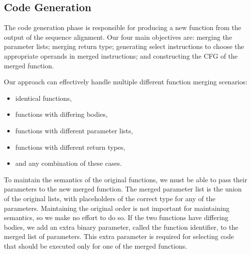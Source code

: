 

\subsection{Code Generation}
The code generation phase is responsible for producing a new function from the output of the sequence alignment.
Our four main objectives are: merging the parameter lists; merging return type; generating select instructions to choose the appropriate
operands in merged instructions; and constructing the CFG of the merged function.

Our approach can effectively handle multiple different function merging scenarios:
\begin{itemize}[noitemsep,topsep=3pt]
  \item identical functions,
  \item functions with differing bodies,
  \item functions with different parameter lists, 
  \item functions with different return types,
  \item and any combination of these cases.
\end{itemize}


To maintain the semantics of the original functions, we must be able to pass their parameters to
the new merged function. The merged parameter list is the union of the original lists, with
placeholders of the correct type for any of the parameters. Maintaining the original order is not
important for maintaining semantics, so we make no effort to do so.
If the two functions have differing bodies, we add an extra binary parameter, called the function
identifier, to the merged list of parameters. This extra parameter is required for selecting code
that should be executed only for one of the merged functions.

